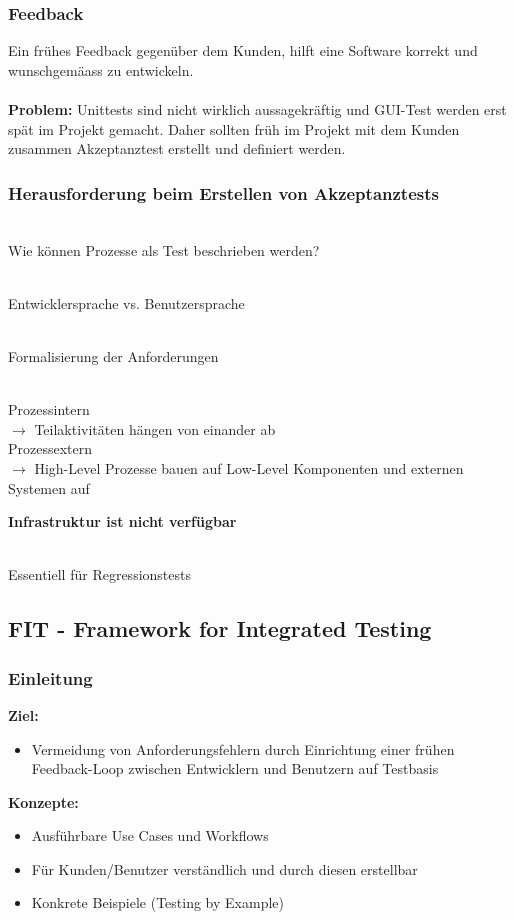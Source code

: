 \documentclass[a4paper,10pt]{article}
\newcommand{\Bold}[1]{\textbf{#1}} %
\begin{document}
\subsubsection{Feedback}
Ein frühes Feedback gegenüber dem Kunden, hilft eine Software korrekt und wunschgemäass zu entwickeln.\\\\
\textbf{\Bold Problem:} Unittests sind nicht wirklich aussagekräftig und GUI-Test werden erst spät im Projekt gemacht. Daher sollten früh im Projekt mit dem Kunden zusammen Akzeptanztest erstellt und definiert werden.

\subsubsection{Herausforderung beim Erstellen von Akzeptanztests}
\begin{description}
\item[\Bold {Prozesse}] \hfill \\ 
	Wie können Prozesse als Test beschrieben werden?
\item[\Bold {Die Sprache}] \hfill \\
	Entwicklersprache vs. Benutzersprache
\item[\Bold{Komplexität}] \hfill \\
	Formalisierung der Anforderungen
\item[\Bold{Abhängigkeiten}] \hfill \\
	Prozessintern\\
	$\rightarrow$ Teilaktivitäten hängen von einander ab\\
	Prozessextern\\
	$\rightarrow$ High-Level Prozesse bauen auf Low-Level Komponenten und externen Systemen auf
\item \Bold {Infrastruktur ist nicht verfügbar}
\item[\Bold {Automatisierung}] \hfill \\ 
	Essentiell für Regressionstests
\end{description}

\subsection{FIT - Framework for Integrated Testing}
\subsubsection{Einleitung}
\Bold {Ziel:}
\begin{itemize}
\item Vermeidung von Anforderungsfehlern durch Einrichtung einer frühen Feedback-Loop zwischen Entwicklern und Benutzern auf Testbasis
\end{itemize}
\Bold {Konzepte:}
\begin{itemize}
\item Ausführbare Use Cases und Workflows
\item Für Kunden/Benutzer verständlich und durch diesen erstellbar
\item Konkrete Beispiele (Testing by Example)
\end{itemize}
\end{document}
